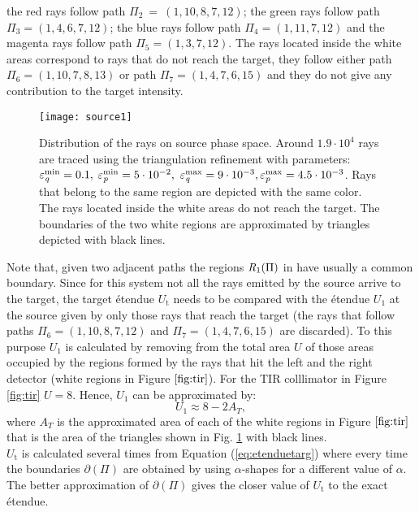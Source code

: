    the red rays follow path $\Pi_2 ~= ~(1, 10, 8, 7, 12)$; the green rays follow path $\Pi_3 = (1, 4, 6, 7, 12)$;
   the blue rays follow path $\Pi_4= (1, 11, 7, 12)$ and the magenta rays follow path $\Pi_5= (1, 3, 7, 12)$. The rays located inside the white areas correspond to rays that do not reach the target, they follow either path $\Pi_6 = (1, 10, 7, 8, 13)$ or path $\Pi_7 = (1,4,7,6,15)$ and they do not give any contribution to the target intensity.
\begin{figure}[h]
  \begin{center}
  \texttt{[image: source1]}
  \end{center}
  \caption{Distribution of the rays on source phase space. Around $1.9 \cdot 10^4$ rays are traced using the triangulation refinement with parameters:
  $\varepsilon_{\textit{q}}^\textrm{min} = 0.1 ,$ $ \varepsilon_{\textit{p}}^\textrm{min} = 5\cdot 10^{-2}, $ $\varepsilon_{\textit{q}}^\textrm{max} = 9\cdot 10^{-3}, \varepsilon_{\textit{p}}^\textrm{max} = 4.5 \cdot 10^{-3}$. Rays that belong to the same region are depicted with the same color. The rays located inside the white areas do not reach the target. The boundaries of the two white regions are approximated by triangles depicted with black lines.}
  \label{fig:sourcePS}
\end{figure}
Note that, given two adjacent paths the regions $\mbox{$\emph{R}_{\textit{$1$}}$}(\Pi)$ in  have usually a common boundary. 
Since for this system not all the rays emitted by the source arrive to the target, the target \'{e}tendue $U_{\textrm{t}}$ needs to be compared with the \'{e}tendue $U_1$ at the source given by only those rays that reach the target (the rays that follow paths $\Pi_6=(1,10,8,7,12)$ and 
$\Pi_7 = (1,4,7,6,15)$ are discarded). To this purpose $U_1$ is calculated by removing from the total area $U$ of  those areas occupied by the regions formed by the rays that hit the left and the right detector (white regions in Figure $\ref{fig:tir}$).  For the TIR colllimator in Figure \ref{fig:tir} $U = 8$. Hence, $U_1$ can be approximated by:
 \begin{equation}\label{eq:Usource}
 U_{1}\approx 8-2A_{T},
 \end{equation}
 where $A_{T}$ is the approximated area of each of the white regions in Figure $\ref{fig:tir}$ that is the area of the triangles shown in Fig. \ref{fig:sourcePS} with black lines.\\ \indent  $U_{\textrm{t}}$ is calculated several times from Equation (\ref{eq:etenduetarg}) where every time the boundaries $\partial$$(\Pi)$ are obtained by using $\alpha$-shapes for a different value of $\alpha$. The better approximation of $\partial$$(\Pi)$ gives the closer value of $U_{\textrm{t}}$ to the exact \'{e}tendue. 
